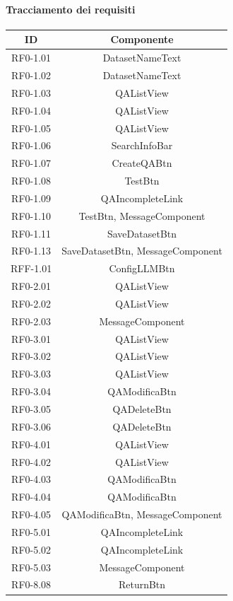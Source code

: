 \paragraph{Tracciamento dei requisiti}
\begin{tabularx}{\textwidth}{|c|c|}
    \hline
    \textbf{ID} & \textbf{Componente} \\
    \hline
        RF0-1.01 & DatasetNameText\\
    \hline
        RF0-1.02 & DatasetNameText\\
    \hline
        RF0-1.03 & QAListView\\
    \hline
        RF0-1.04 & QAListView\\
    \hline
        RF0-1.05 & QAListView\\
    \hline
        RF0-1.06 & SearchInfoBar\\
    \hline
        RF0-1.07 & CreateQABtn\\
    \hline
        RF0-1.08 & TestBtn\\
    \hline
        RF0-1.09 & QAIncompleteLink\\
    \hline
        RF0-1.10 & TestBtn, MessageComponent\\
    \hline
        RF0-1.11 & SaveDatasetBtn\\
    \hline
        RF0-1.13 & SaveDatasetBtn, MessageComponent\\
    \hline
        RFF-1.01 & ConfigLLMBtn\\ %
    \hline
        RF0-2.01 & QAListView\\
    \hline
        RF0-2.02 & QAListView\\
    \hline
        RF0-2.03 & MessageComponent\\
    \hline
        RF0-3.01 & QAListView\\
    \hline
        RF0-3.02 & QAListView\\
    \hline
        RF0-3.03 & QAListView\\
    \hline
        RF0-3.04 & QAModificaBtn\\
    \hline
        RF0-3.05 & QADeleteBtn\\
    \hline
        RF0-3.06 & QADeleteBtn\\
    \hline
        RF0-4.01 & QAListView\\
    \hline
        RF0-4.02 & QAListView\\
    \hline
        RF0-4.03 & QAModificaBtn\\
    \hline
        RF0-4.04 & QAModificaBtn\\
    \hline
        RF0-4.05 & QAModificaBtn, MessageComponent\\
    \hline
        RF0-5.01 & QAIncompleteLink\\
    \hline
        RF0-5.02 & QAIncompleteLink\\
    \hline
        RF0-5.03 & MessageComponent\\
    \hline
        RF0-8.08 & ReturnBtn\\
    \hline
\end{tabularx}